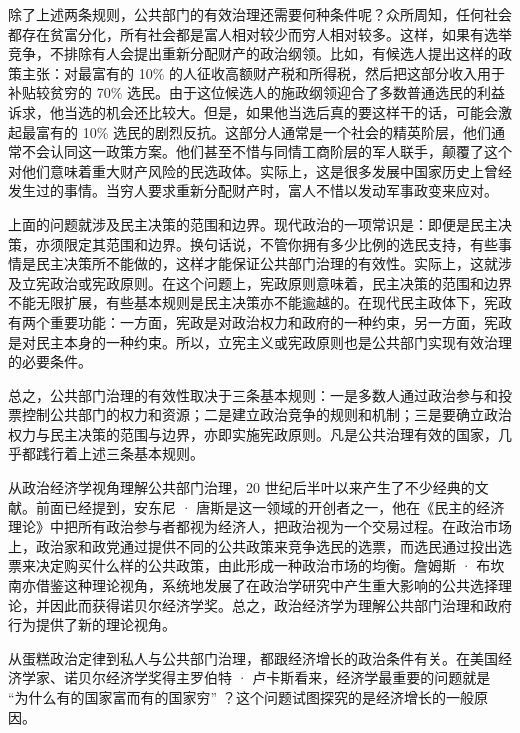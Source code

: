 除了上述两条规则，公共部门的有效治理还需要何种条件呢？众所周知，任何社会都存在贫富分化，所有社会都是富人相对较少而穷人相对较多。这样，如果有选举竞争，不排除有人会提出重新分配财产的政治纲领。比如，有候选人提出这样的政策主张：对最富有的 10\% 的人征收高额财产税和所得税，然后把这部分收入用于补贴较贫穷的 70\% 选民。由于这位候选人的施政纲领迎合了多数普通选民的利益诉求，他当选的机会还比较大。但是，如果他当选后真的要这样干的话，可能会激起最富有的 10\% 选民的剧烈反抗。这部分人通常是一个社会的精英阶层，他们通常不会认同这一政策方案。他们甚至不惜与同情工商阶层的军人联手，颠覆了这个对他们意味着重大财产风险的民选政体。实际上，这是很多发展中国家历史上曾经发生过的事情。当穷人要求重新分配财产时，富人不惜以发动军事政变来应对。

上面的问题就涉及民主决策的范围和边界。现代政治的一项常识是：即便是民主决策，亦须限定其范围和边界。换句话说，不管你拥有多少比例的选民支持，有些事情是民主决策所不能做的，这样才能保证公共部门治理的有效性。实际上，这就涉及立宪政治或宪政原则。在这个问题上，宪政原则意味着，民主决策的范围和边界不能无限扩展，有些基本规则是民主决策亦不能逾越的。在现代民主政体下，宪政有两个重要功能：一方面，宪政是对政治权力和政府的一种约束，另一方面，宪政是对民主本身的一种约束。所以，立宪主义或宪政原则也是公共部门实现有效治理的必要条件。

总之，公共部门治理的有效性取决于三条基本规则：一是多数人通过政治参与和投票控制公共部门的权力和资源；二是建立政治竞争的规则和机制；三是要确立政治权力与民主决策的范围与边界，亦即实施宪政原则。凡是公共治理有效的国家，几乎都践行着上述三条基本规则。

从政治经济学视角理解公共部门治理，20 世纪后半叶以来产生了不少经典的文献。前面已经提到，安东尼 · 唐斯是这一领域的开创者之一，他在《民主的经济理论》中把所有政治参与者都视为经济人，把政治视为一个交易过程。在政治市场上，政治家和政党通过提供不同的公共政策来竞争选民的选票，而选民通过投出选票来决定购买什么样的公共政策，由此形成一种政治市场的均衡。詹姆斯 · 布坎南亦借鉴这种理论视角，系统地发展了在政治学研究中产生重大影响的公共选择理论，并因此而获得诺贝尔经济学奖。总之，政治经济学为理解公共部门治理和政府行为提供了新的理论视角。


从蛋糕政治定律到私人与公共部门治理，都跟经济增长的政治条件有关。在美国经济学家、诺贝尔经济学奖得主罗伯特 · 卢卡斯看来，经济学最重要的问题就是 “为什么有的国家富而有的国家穷” ？这个问题试图探究的是经济增长的一般原因。

